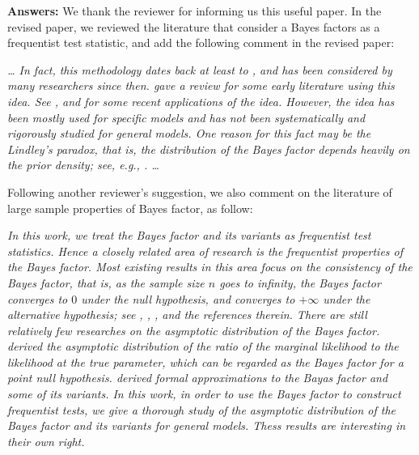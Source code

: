 \documentclass[11pt]{article}
\theoremstyle{plain}
\theoremstyle{definition}
\theoremstyle{remark}
\begin{document}
\textbf{Answers:}
We thank the reviewer for informing us this useful paper.
In the revised paper, we reviewed the literature that consider a Bayes factors as a frequentist test statistic, and add the following comment in the revised paper:
\begin{adjustwidth}{1.5em}{1.5em}
    \emph{
        \dots
In fact, this methodology dates back at least to \cite{Good1967}, and has been considered by many
researchers since then.
\cite{Good1992} gave a review for some early literature using this idea.                                  
See \cite{Aerts2004}, \cite{zhou2018On} and \cite{Wang2020} for some recent applications of the idea. 
However, the idea has been mostly used for specific models and has not been systematically and rigorously studied for general models.                                  
One reason for this fact may be the Lindley's paradox, that is, the distribution of the Bayes factor depends heavily on the prior density; see, e.g., \cite{Shafer1982}. \ldots
}
\end{adjustwidth}
Following another reviewer's suggestion, we also comment on the literature of large sample properties of Bayes factor, as follow:
\begin{adjustwidth}{1.5em}{1.5em}
    \emph{
        In this work, we treat the Bayes factor and its variants as frequentist test statistics.
        Hence a closely related area of research is the frequentist properties of the Bayes factor.
        Most existing results in this area focus on the consistency of the Bayes factor,  that is, as the sample size $n$  goes to infinity, the Bayes factor converges to $0$ under the null hypothesis, and converges to $+\infty$ under the alternative hypothesis; see \cite{berger2003approximations}, \cite{moreno2010},      \cite{WangMin2016}, \cite{Chatterjee2017} and the references therein.
        There are still relatively few researches on the asymptotic distribution of the Bayes factor.
        \cite{clarke1990information} derived the asymptotic distribution of the ratio of the marginal likelihood to the likelihood at the true parameter, which can be regarded as the Bayes factor for a point null hypothesis.
        \cite{Gelfand1994} derived formal approximations to the Bayas factor and some of its variants.
        In this work, in order to use the Bayes factor to construct frequentist tests, we give a thorough study of the asymptotic distribution of the Bayes factor and its variants for general models.
        Thess results are interesting in their own right.
}
\end{adjustwidth}
\end{document}
